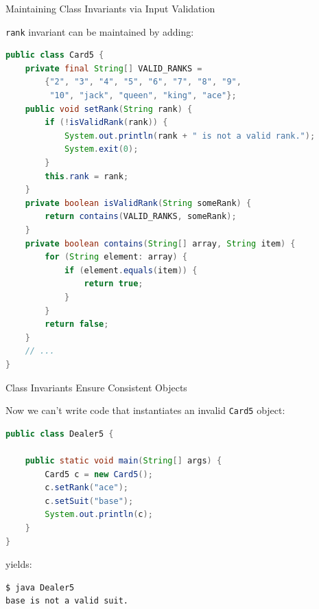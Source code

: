 \documentclass{beamer}
\begin{document}
\begin{frame}[fragile]{Maintaining Class Invariants via Input Validation}


\vspace{-.05in}
{\tt rank} invariant can be maintained by adding:
\vspace{-.05in}
\begin{lstlisting}[language=Java]
public class Card5 {
    private final String[] VALID_RANKS =
        {"2", "3", "4", "5", "6", "7", "8", "9",
         "10", "jack", "queen", "king", "ace"};
    public void setRank(String rank) {
        if (!isValidRank(rank)) {
            System.out.println(rank + " is not a valid rank.");
            System.exit(0);
        }
        this.rank = rank;
    }
    private boolean isValidRank(String someRank) {
        return contains(VALID_RANKS, someRank);
    }
    private boolean contains(String[] array, String item) {
        for (String element: array) {
            if (element.equals(item)) {
                return true;
            }
        }
        return false;
    }
    // ...
}
\end{lstlisting}

\end{frame}

\begin{frame}[fragile]{Class Invariants Ensure Consistent Objects}


Now we can't write code that instantiates an invalid {\tt Card5} object:
\begin{lstlisting}[language=Java]
public class Dealer5 {

    public static void main(String[] args) {
        Card5 c = new Card5();
        c.setRank("ace");
        c.setSuit("base");
        System.out.println(c);
    }
}
\end{lstlisting}
yields:
\begin{lstlisting}[language=bash]
$ java Dealer5
base is not a valid suit.
\end{lstlisting}

\end{frame}
\end{document}
